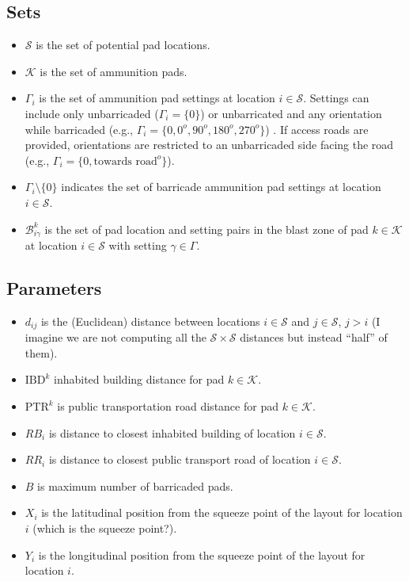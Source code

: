 \documentclass[10pt]{article}
\newcommand{\luiscomm}[1]{{\color{magenta} #1}}
\begin{document}
	\subsection{Sets}
	\begin{itemize}
		\item $\mathcal{S}$ is the set of potential pad locations.
		\item $\mathcal{K}$ is the set of ammunition pads.
		\item $\Gamma_i$ is the set of ammunition pad settings at location $ i \in \mathcal{S}$. Settings can include only unbarricaded ($\Gamma_i = \{0\}$) or unbarricated and any orientation while barricaded (e.g., $\Gamma_i = \{0, 0^o, 90^o, 180^o, 270^o\}$) . If access roads are provided, orientations are restricted to an unbarricaded side facing the road (e.g., $\Gamma_i = \{0, \text{towards road}^o\}$).
		\item $\Gamma_i \setminus \{0\}$ indicates the set of barricade ammunition pad settings at location $i \in \mathcal{S}$.
		\item $ \mathcal{B}_{i\gamma}^{k} $ is the set of pad location and setting pairs in the blast zone of pad $ k \in \mathcal{K}$ at location $ i \in \mathcal{S}$ with setting $ \gamma \in \Gamma $. 
	\end{itemize}
	
	\subsection{Parameters}
	\begin{itemize}
		\item $d_{ij}$ is the (Euclidean) distance between locations $ i \in \mathcal{S}$ and $ j \in \mathcal{S}$, $j> i$ \luiscomm{(I imagine we are not computing all the $\mathcal{S} \times \mathcal{S}$ distances but instead ``half'' of them)}.
		\item $\text{IBD}^k$ inhabited building distance for pad $ k \in \mathcal{K}$.
		\item $\text{PTR}^k$ is public transportation road distance for pad $ k \in \mathcal{K}$.
		\item $ RB_i $ is distance to closest inhabited building of location $i \in \mathcal{S}$.
		\item $ RR_i $ is distance to closest public transport road of location $i \in \mathcal{S}$.
		\item $ B $ is maximum number of barricaded pads.
		\item $ X_i $ is the latitudinal position from the squeeze point of the layout for location $ i $ \luiscomm{(which is the squeeze point?)}.
		\item $ Y_i $ is the longitudinal position from the squeeze point of the layout for location $ i $.
	\end{itemize}
	
\end{document}
